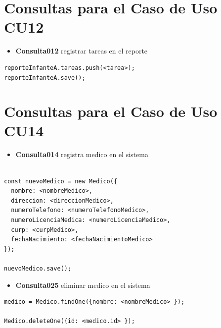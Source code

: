 \section{Consultas para el Caso de Uso CU12}

\begin{itemize}
    \item \textbf{Consulta012} registrar tareas en el reporte
\end{itemize}

\begin{verbatim}
reporteInfanteA.tareas.push(<tarea>);
reporteInfanteA.save();
\end{verbatim}

\section{Consultas para el Caso de Uso CU14}

\begin{itemize}
    \item \textbf{Consulta014} registra medico en el sistema
\end{itemize}

\begin{verbatim}

const nuevoMedico = new Medico({
  nombre: <nombreMedico>,
  direccion: <direccionMedico>,
  numeroTelefono: <numeroTelefonoMedico>,
  numeroLicenciaMedica: <numeroLicenciaMedico>,
  curp: <curpMedico>,
  fechaNacimiento: <fechaNacimientoMedico>
});
    
nuevoMedico.save();

\end{verbatim}



\begin{itemize}
    \item \textbf{Consulta025} eliminar medico en el sistema
\end{itemize}

\begin{verbatim}
medico = Medico.findOne({nombre: <nombreMedico> });

Medico.deleteOne({id: <medico.id> });



\end{verbatim}

